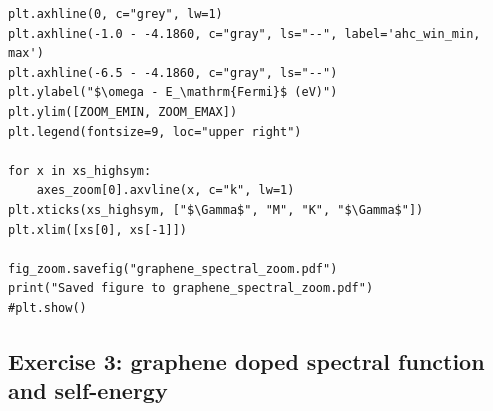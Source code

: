 \documentclass[a4paper,11pt,serif]{article}
\begin{document}
\begin{scriptsize}
\begin{Verbatim}[frame=single]
plt.axhline(0, c="grey", lw=1)
plt.axhline(-1.0 - -4.1860, c="gray", ls="--", label='ahc_win_min, max')
plt.axhline(-6.5 - -4.1860, c="gray", ls="--")
plt.ylabel("$\omega - E_\mathrm{Fermi}$ (eV)")
plt.ylim([ZOOM_EMIN, ZOOM_EMAX])
plt.legend(fontsize=9, loc="upper right")

for x in xs_highsym:
    axes_zoom[0].axvline(x, c="k", lw=1)
plt.xticks(xs_highsym, ["$\Gamma$", "M", "K", "$\Gamma$"])
plt.xlim([xs[0], xs[-1]])

fig_zoom.savefig("graphene_spectral_zoom.pdf")
print("Saved figure to graphene_spectral_zoom.pdf")
#plt.show()
\end{Verbatim}
\end{scriptsize}

\subsection*{Exercise 3: graphene doped spectral function and self-energy}
\end{document}
